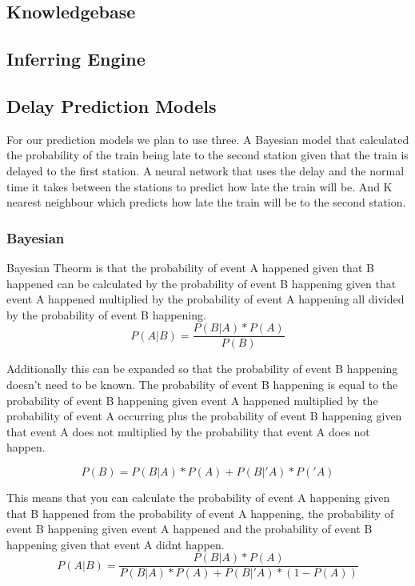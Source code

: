 \documentclass[11pt]{article}
\begin{document}
	\subsection{Knowledgebase}
	
	\subsection{Inferring Engine}
	
	\subsection{Delay Prediction Models}
	
	For our prediction models we plan to use three. A Bayesian model that calculated the probability of the train being late to the second station given that the train is delayed to the first station. A neural network that uses the delay and the normal time it takes between the stations to predict how late the train will be. And K nearest neighbour which predicts how late the train will be to the second station.
	
	\subsubsection{Bayesian}
	
	Bayesian Theorm is that the probability of event A happened given that B happened can be calculated by the probability of event B happening given that event A happened multiplied by the probability of event A happening all divided by the probability of event B happening.	
	\[P(A|B) = \frac{P(B|A) * P(A)}{P(B)}\]
	
	Additionally this can be expanded so that the probability of event B happening doesn't need to be known. The probability of event B happening is equal to the probability of event B happening given event A happened multiplied by the probability of event A occurring plus the probability of event B happening given that event A does not multiplied by the probability that event A does not happen.
	
	\[P(B) = P(B|A) * P(A) + P(B|'A) * P('A)\]
	
	This means that you can calculate the probability of event A happening given that B happened from the probability of event A happening, the probability of  event B happening given event A happened and the probability of event B happening given that event A didnt happen.
	\[P(A|B) = \frac{P(B|A) * P(A)}{P(B|A) * P(A) + P(B|'A) * (1 - P(A))} \]	
	
\end{document}
